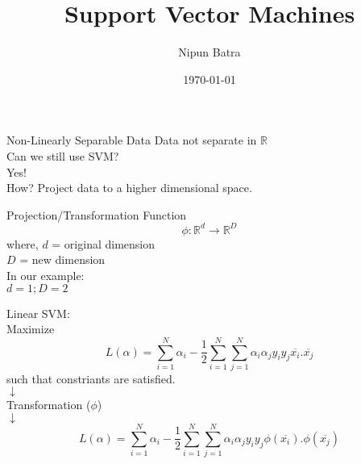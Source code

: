 \documentclass{beamer}
\title{Support Vector Machines}
\date{\today}
\author{Nipun Batra}
\institute{IIT Gandhinagar}
\begin{document}
	\maketitle
	
	\begin{frame}{Non-Linearly Separable Data}
	    Data not separate in $\mathbb{R}$ \\
	    \vspace{0.5cm}
	    Can we still use SVM? \\
	    \vspace{0.5cm}
	    Yes!\\
	    How? Project data to a higher dimensional space.
	\end{frame}
	\begin{frame}{Projection/Transformation Function}
	    \begin{equation*}
	        \phi : \mathbb{R}^{d} \rightarrow \mathbb{R}^{D}
	    \end{equation*}
	    where, $d$ = original dimension \\
	    \hspace{1cm} $D$ = new dimension \\
	    In our example:\\
	    \hspace{1cm} $d = 1; D = 2$ 
	\end{frame}
	\begin{frame}{}
	    Linear SVM:\\
	    \hspace{1cm} Maximize\\
	    \begin{equation*}
	        L(\alpha) = \sum_{i=1}^{N}\alpha_{i} - \frac{1}{2}\sum_{i=1}^{N}\sum_{j=1}^{N}\alpha_{i}\alpha_{j}y_{i}y_{j}\overline{x_{i}}.\overline{x_{j}}
	    \end{equation*}
	    \hspace{1cm} such that constriants are satisfied.\\
	   \hspace{5cm} $\downarrow$\\
	   \hspace{3.8cm} Transformation ($\phi$)\\
	   \hspace{5cm} $\downarrow$\\
	   \begin{equation*}
	       L(\alpha) = \sum_{i=1}^{N}\alpha_{i} - \frac{1}{2}\sum_{i=1}^{N}\sum_{j=1}^{N}\alpha_{i}\alpha_{j}y_{i}y_{j}\phi(\overline{x_{i}}).\phi(\overline{x_{j}})
	   \end{equation*}
	\end{frame}
\end{document}
